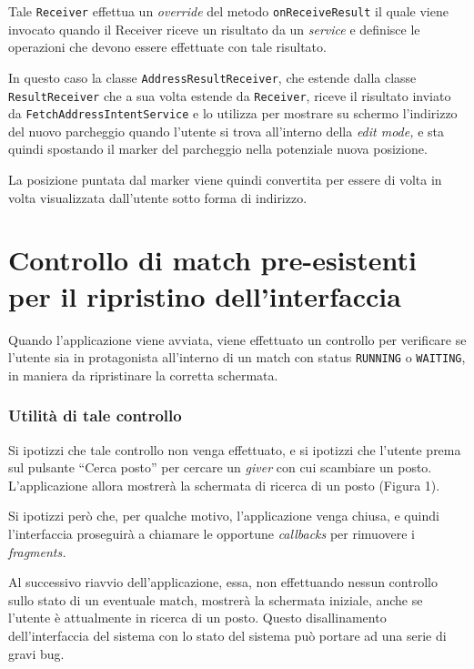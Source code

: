 Tale \texttt{Receiver} effettua un \emph{override} del metodo
\texttt{onReceiveResult} il quale viene invocato quando il Receiver
riceve un risultato da un \emph{service} e definisce le operazioni che
devono essere effettuate con tale risultato.

In questo caso la classe \texttt{AddressResultReceiver}, che estende
dalla classe \texttt{ResultReceiver} che a sua volta estende da
\texttt{Receiver}, riceve il risultato inviato da
\texttt{FetchAddressIntentService} e lo utilizza per mostrare su schermo
l'indirizzo del nuovo parcheggio quando l'utente si trova all'interno
della \emph{edit mode,} e sta quindi spostando il marker del parcheggio
nella potenziale nuova posizione.

La posizione puntata dal marker viene quindi convertita per essere di
volta in volta visualizzata dall'utente sotto forma di indirizzo.

\hypertarget{controllo-di-match-pre-esistenti-per-il-ripristino-dellinterfaccia}{%
\section{Controllo di match pre-esistenti per il ripristino
dell'interfaccia}\label{controllo-di-match-pre-esistenti-per-il-ripristino-dellinterfaccia}}

Quando l'applicazione viene avviata, viene effettuato un controllo per
verificare se l'utente sia in protagonista all'interno di un match con
status \texttt{RUNNING} o \texttt{WAITING}, in maniera da ripristinare
la corretta schermata.

\hypertarget{utilituxe0-di-tale-controllo}{%
\subsubsection{Utilità di tale
controllo}\label{utilituxe0-di-tale-controllo}}

Si ipotizzi che tale controllo non venga effettuato, e si ipotizzi che
l'utente prema sul pulsante ``Cerca posto'' per cercare un \emph{giver}
con cui scambiare un posto. L'applicazione allora mostrerà la schermata
di ricerca di un posto (Figura 1).

Si ipotizzi però che, per qualche motivo, l'applicazione venga chiusa, e
quindi l'interfaccia proseguirà a chiamare le opportune \emph{callbacks}
per rimuovere i \emph{fragments.}

Al successivo riavvio dell'applicazione, essa, non effettuando nessun
controllo sullo stato di un eventuale match, mostrerà la schermata
iniziale, anche se l'utente è attualmente in ricerca di un posto. Questo
disallinamento dell'interfaccia del sistema con lo stato del sistema può
portare ad una serie di gravi bug.

